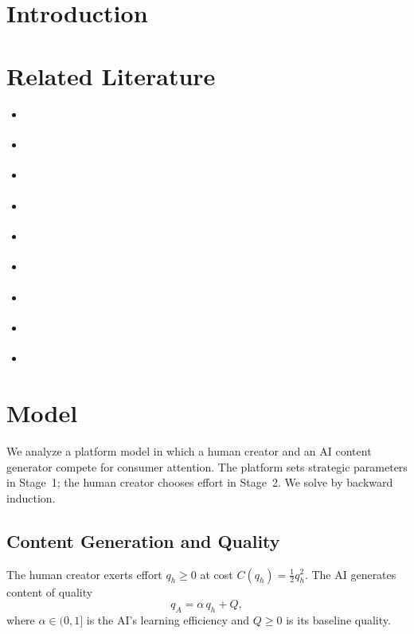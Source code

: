 \documentclass[mnsc,nonblindrev]{informs3_NoOR}
\begin{document}
\maketitle


\section{Introduction}

\section{Related Literature}
\begin{itemize}
\item \cite{ai_genai_2026}
\item \cite{esmaeili_how_2025}
\item \cite{taitler_braesss_2024}
\item \cite{taitler_data_2025}
\item \cite{taitler_selective_2025}
\item \cite{yao_rethinking_2023}
\item \cite{yao_human_2024}
\item \cite{yao_user_2024}
\item \cite{yu_beyond_2025}
\end{itemize}


\section{Model}\label{sec:model}
 
We analyze a platform model in which a human creator and an AI content generator compete for consumer attention. The platform sets strategic parameters in Stage~1; the human creator chooses effort in Stage~2. We solve by backward induction.
 
\subsection{Content Generation and Quality}
 
The human creator exerts effort $q_h \geq 0$ at cost $C(q_h) = \tfrac{1}{2}q_h^2$. The AI generates content of quality
\begin{equation}\label{eq:qA}
q_A = \alpha\, q_h + Q,
\end{equation}
where $\alpha \in (0,1]$ is the AI's learning efficiency and $Q \geq 0$ is its baseline quality.
 
\end{document}
